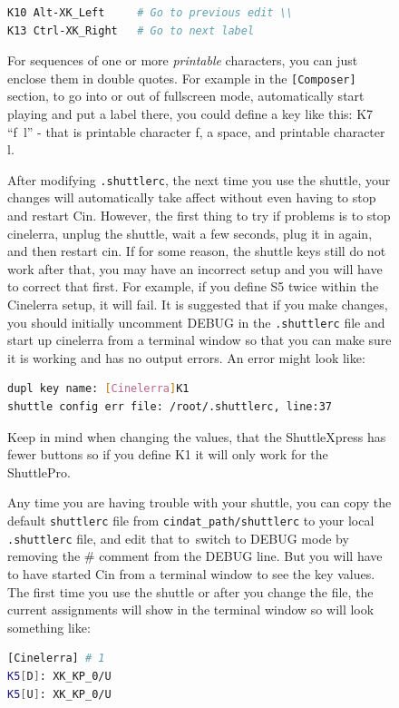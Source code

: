 \begin{figure}
\begin{lstlisting}[language=bash]
K10 Alt-XK_Left  	# Go to previous edit \\
K13 Ctrl-XK_Right 	# Go to next label
\end{lstlisting}

\noindent For sequences of one or more \textit{printable} characters, you can just enclose them in double quotes.  For example in the \texttt{[Composer]} section, to go into or out of fullscreen mode, automatically start playing and put a label there, you could define a key like this:  K7 “f~l” - that is printable character f, a space, and printable character l.  

After modifying \texttt{.shuttlerc}, the next time you use the shuttle, your changes will automatically take affect without even having to stop and restart Cin.  However, the first thing to try if problems is to stop cinelerra, unplug the shuttle, wait a few seconds, plug it in again, and then restart cin.  If for some reason, the shuttle keys still do not work after that, you may have an incorrect setup and you will have to correct that first.  For example, if you define S5 twice within the Cinelerra setup, it will fail.  It is suggested that if you make changes, you should initially uncomment DEBUG in the \texttt{.shuttlerc} file and start up cinelerra from a terminal window so that you can make sure it is working and has no output errors.  An error might look like:

\begin{lstlisting}[language=Bash]
dupl key name: [Cinelerra]K1 
shuttle config err file: /root/.shuttlerc, line:37
\end{lstlisting}

\noindent Keep in mind when changing the values, that the ShuttleXpress has fewer buttons so if you define K1 it will only work for the ShuttlePro. 

Any time you are having trouble with your shuttle, you can copy the default \texttt{shuttlerc} file from \texttt{{cindat\_path}/shuttlerc} to your local \texttt{.shuttlerc} file, and edit that to\ switch to DEBUG mode by removing the \# comment from the DEBUG line.  But you will have to have started Cin from a terminal window to see the key values. The first time you use the shuttle or after you change the file, the current assignments will show in the terminal window so will look something like:

\begin{lstlisting}[language=Bash]
[Cinelerra] # 1 
K5[D]: XK_KP_0/U 
K5[U]: XK_KP_0/U 
\end{lstlisting}


\end{figure}
